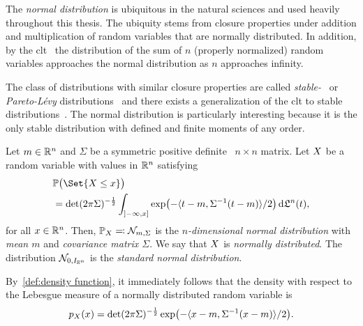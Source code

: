 The \emph{normal distribution} is ubiquitous in the natural sciences and used heavily throughout this thesis.
The ubiquity stems from closure properties under addition and multiplication of random variables that are normally distributed.
In addition, by the \gls{clt}~\cite[theorem 27.2]{Billingsley1995-ba} the distribution of the sum of \( n \) (properly normalized) random variables approaches the normal distribution as \( n \) approaches infinity.
\begin{remark}
	The class of distributions with similar closure properties are called \emph{stable-}~\cite[page 377]{Billingsley1995-ba,Nolan2020} or \emph{Pareto-Lévy} distributions~\cite{Mandelbrot1960} and there exists a generalization of the \gls{clt} to stable distributions~\cite[theorem 1.4]{Nolan2020}.
	The normal distribution is particularly interesting because it is the only stable distribution with defined and finite moments of any order.
\end{remark}
\begin{definition}%
	\label{def:normal distribution}
	Let \( m \in \mathbb{R}^n \) and \( \Sigma \) be a symmetric positive definite \ \( n \times n \) matrix.
	Let \( X \) be a random variable with values in \( \mathbb{R}^n \) satisfying
	\begin{equation}
		\begin{aligned}
			&\ProbabilityMeasure\bigl(\Set{\RandomVariable \leq x}\bigr) \\
			&= \det(2\pi\Sigma)^{-\frac{1}{2}} \int_{\linterval{-\infty}{x}} \exp \bigl( -\inprod{t - m}{\Sigma^{-1}(t-m)}/2 \bigr)\,\mathrm{d}\LebesgueMeasure^n(t),
		\end{aligned}
	\end{equation}
	for all \( x \in \mathbb{R}^n \).
	Then, \( \mathbb{P}_X \eqqcolon \mathcal{N}_{m,\Sigma} \) is the \emph{\( n \)-dimensional normal distribution} with \emph{mean \( m \)} and \emph{covariance matrix \( \Sigma \)}.
	We say that \( X \) is \emph{normally distributed}.
	The distribution \( \mathcal{N}_{\num{0}, I_{\mathbb{R}^n}} \) is the \emph{standard normal distribution}.

	By~\cref{def:density function}, it immediately follows that the density with respect to the Lebesgue measure of a normally distributed random variable is
	\begin{equation}
		p_X(x) = \det(2\pi\Sigma)^{-\frac{1}{2}} \exp\bigl(-\langle x - m, \Sigma^{-1}(x - m) \rangle/2\bigr).
	\end{equation}
\end{definition}
